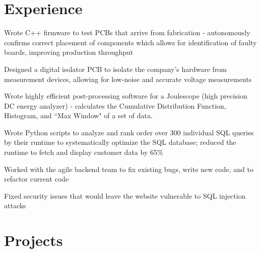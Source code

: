 \documentclass[]{deedy-resume-openfont}
\begin{document}


\section{Experience}

\begin{tightemize}
    \item Wrote C++ firmware to test PCBs that arrive from fabrication - autonomously confirms correct placement of components which allows for identification of faulty boards, improving production throughput
    \item Designed a digital isolator PCB to isolate the company's hardware from measurement devices, allowing for low-noise and accurate voltage measurements
    \item Wrote highly efficient post-processing software for a Joulescope (high precision DC energy analyzer) - calculates the Cumulative Distribution Function, Histogram, and ``Max Window" of a set of data.
\end{tightemize}
\vspace{8pt}

\begin{tightemize}
    \item Wrote Python scripts to analyze and rank order over 300 individual SQL queries by their runtime to systematically optimize the SQL database; reduced the runtime to fetch and display customer data by 65\%
    \item Worked with the agile backend team to fix existing bugs, write new code, and to refactor current code
    \item Fixed security issues that would leave the website vulnerable to SQL injection attacks
\end{tightemize}
\vspace{12pt}


\section{Projects}
\end{document}
